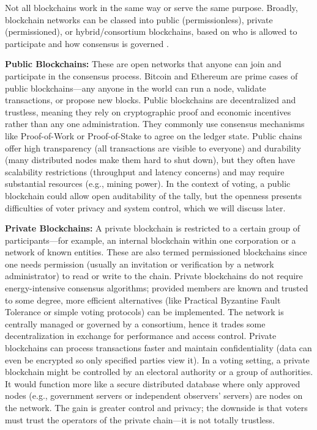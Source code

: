\documentclass[a4paper,10pt]{report}
\begin{document}
Not all blockchains work in the same way or serve the same purpose.   Broadly, blockchain networks can be classed into public (permissionless), private (permissioned), or hybrid/consortium blockchains, based on who is allowed to participate and how consensus is governed \cite{linkedin2022blocktypes}.

  \textbf  {Public Blockchains:}   These are open networks that anyone can join and participate in the consensus process.   Bitcoin and Ethereum are prime cases of public blockchains—any anyone in the world can run a node, validate transactions, or propose new blocks.   Public blockchains are decentralized and trustless, meaning they rely on cryptographic proof and economic incentives rather than any one administration.   They commonly use consensus mechanisms like Proof-of-Work or Proof-of-Stake to agree on the ledger state.   Public chains offer high transparency (all transactions are visible to everyone) and durability (many distributed nodes make them hard to shut down), but they often have scalability restrictions (throughput and latency concerns) and may require substantial resources (e.g., mining power).   In the context of voting, a public blockchain could allow open auditability of the tally, but the openness presents difficulties of voter privacy and system control, which we will discuss later.

  \textbf  {Private Blockchains:}   A private blockchain is restricted to a certain group of participants—for example, an internal blockchain within one corporation or a network of known entities.   These are also termed permissioned blockchains since one needs permission (usually an invitation or verification by a network administrator) to read or write to the chain.   Private blockchains do not require energy-intensive consensus algorithms; provided members are known and trusted to some degree, more efficient alternatives (like Practical Byzantine Fault Tolerance or simple voting protocols) can be implemented.   The network is centrally managed or governed by a consortium, hence it trades some decentralization in exchange for performance and access control.   Private blockchains can process transactions faster and maintain confidentiality (data can even be encrypted so only specified parties view it).   In a voting setting, a private blockchain might be controlled by an electoral authority or a group of authorities.   It would function more like a secure distributed database where only approved nodes (e.g., government servers or independent observers’ servers) are nodes on the network.   The gain is greater control and privacy; the downside is that voters must trust the operators of the private chain—it is not totally trustless.
\end{document}
